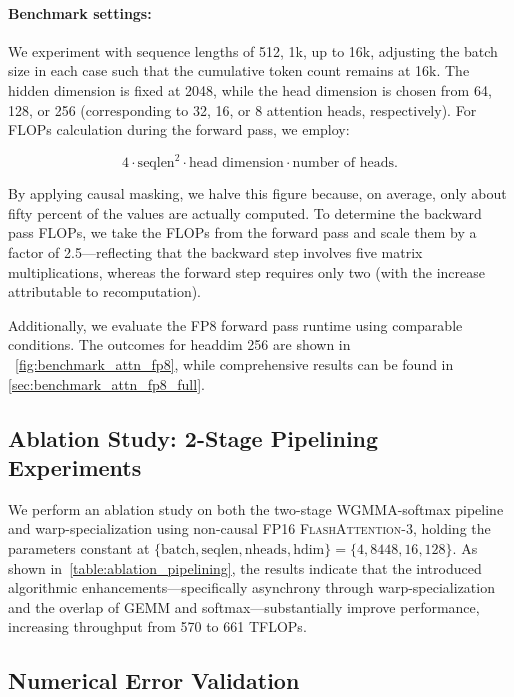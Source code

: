 \paragraph{Benchmark settings:} We experiment with sequence lengths of 512, 1k, up to 16k, adjusting the batch size in each case such that the cumulative token count remains at 16k. The hidden dimension is fixed at 2048, while the head dimension is chosen from 64, 128, or 256 (corresponding to 32, 16, or 8 attention heads, respectively). For FLOPs calculation during the forward pass, we employ:

\begin{equation*}
  4 \cdot \text{seqlen}^2 \cdot \text{head dimension} \cdot \text{number of heads}.
\end{equation*}

By applying causal masking, we halve this figure because, on average, only about fifty percent of the values are actually computed. To determine the backward pass FLOPs, we take the FLOPs from the forward pass and scale them by a factor of 2.5—reflecting that the backward step involves five matrix multiplications, whereas the forward step requires only two (with the increase attributable to recomputation).

Additionally, we evaluate the FP8 forward pass runtime using comparable conditions. The outcomes for headdim 256 are shown in ~\cref{fig:benchmark_attn_fp8}, while comprehensive results can be found in \cref{sec:benchmark_attn_fp8_full}.

\subsection{Ablation Study: 2-Stage Pipelining Experiments}
\label{sec:2-stage-pipelining-experiments}

We perform an ablation study on both the two-stage WGMMA-softmax pipeline and warp-specialization using non-causal FP16 \textsc{FlashAttention-3}, holding the parameters constant at $\{\text{batch}, \text{seqlen}, \text{nheads}, \text{hdim}\} = \{ 4, 8448, 16, 128\}$. As shown in~\cref{table:ablation_pipelining}, the results indicate that the introduced algorithmic enhancements—specifically asynchrony through warp-specialization and the overlap of GEMM and softmax—substantially improve performance, increasing throughput from 570 to 661 TFLOPs.

\subsection{Numerical Error Validation}
\label{sec:numerical_error}

